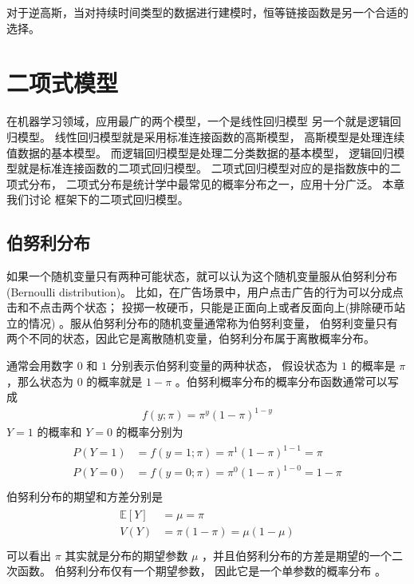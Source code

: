 \documentclass[letterpaper,10pt,english]{sphinxmanual}
\begin{document}
对于逆高斯，当对持续时间类型的数据进行建模时，恒等链接函数是另一个合适的选择。


\chapter{二项式模型}
\label{\detokenize{_u4e8c_u9879_u6a21_u578b/content:id1}}\label{\detokenize{_u4e8c_u9879_u6a21_u578b/content::doc}}
在机器学习领域，应用最广的两个模型，一个是线性回归模型
另一个就是逻辑回归模型。
线性回归模型就是采用标准连接函数的高斯模型，
高斯模型是处理连续值数据的基本模型。
而逻辑回归模型是处理二分类数据的基本模型，
逻辑回归模型就是标准连接函数的二项式回归模型。
二项式回归模型对应的是指数族中的二项式分布，
二项式分布是统计学中最常见的概率分布之一，应用十分广泛。
本章我们讨论  框架下的二项式回归模型。


\section{伯努利分布}
\label{\detokenize{_u4e8c_u9879_u6a21_u578b/content:id2}}
如果一个随机变量只有两种可能状态，就可以认为这个随机变量服从伯努利分布(Bernoulli distribution)。
比如，在广告场景中，用户点击广告的行为可以分成点击和不点击两个状态；
投掷一枚硬币，只能是正面向上或者反面向上(排除硬币站立的情况)
。服从伯努利分布的随机变量通常称为伯努利变量，
伯努利变量只有两个不同的状态，因此它是离散随机变量，伯努利分布属于离散概率分布。

通常会用数字 \(0\) 和 \(1\) 分别表示伯努利变量的两种状态，
假设状态为 \(1\) 的概率是 \(\pi\)
，那么状态为 \(0\) 的概率就是 \(1-\pi\)
。伯努利概率分布的概率分布函数通常可以写成
\begin{equation}\label{equation:二项模型/content:eq_binomial_00}
\begin{split}f(y;\pi) = \pi^y(1-\pi)^{1-y}\end{split}
\end{equation}
\(Y=1\) 的概率和 \(Y=0\) 的概率分别为
\begin{align}\label{equation:二项模型/content:二项模型/content:0}\!\begin{aligned}
P(Y=1) &= f(y=1;\pi) = \pi^1(1-\pi)^{1-1} = \pi\\
P(Y=0) &= f(y=0;\pi) = \pi^0(1-\pi)^{1-0} = 1-\pi\\
\end{aligned}\end{align}
伯努利分布的期望和方差分别是
\begin{align}\label{equation:二项模型/content:二项模型/content:1}\!\begin{aligned}
\mathbb{E}[Y] &= \mu = \pi\\
V(Y) &= \pi(1-\pi) = \mu(1-\mu)\\
\end{aligned}\end{align}
可以看出 \(\pi\) 其实就是分布的期望参数 \(\mu\)
，并且伯努利分布的方差是期望的一个二次函数。
伯努利分布仅有一个期望参数，
因此它是一个单参数的概率分布
。
\end{document}

